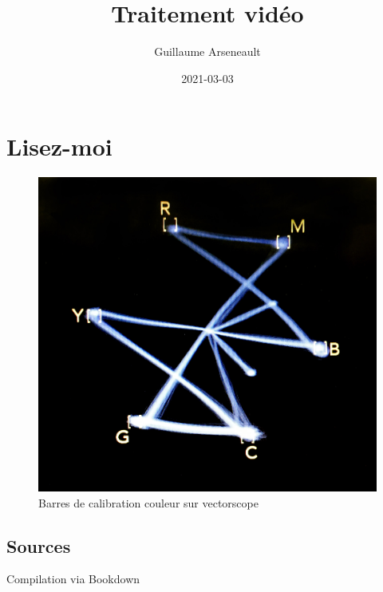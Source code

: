 \documentclass[
  french,
]{book}
\title{Traitement vidéo}
\author{Guillaume Arseneault}
\date{2021-03-03}
\begin{document}
\maketitle

{
\setcounter{tocdepth}{1}
\tableofcontents
}
\hypertarget{lisez-moi}{%
\chapter*{Lisez-moi}\label{lisez-moi}}

\begin{figure}
\centering
\includegraphics{images/vectorscope.jpg}
\caption{\label{fig:unnamed-chunk-1}Barres de calibration couleur sur vectorscope \citep{marsh_ColorBarsVectorscope_2016}}
\end{figure}

\hypertarget{sources}{%
\section*{Sources}\label{sources}}

Compilation via Bookdown \citep{xie_BookdownAuthoringBooks_2020}
\end{document}
